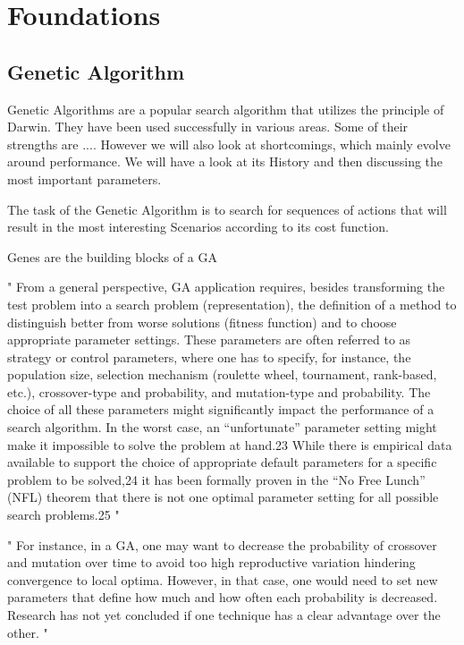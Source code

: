 \chapter{Foundations}
\label{chap:foundation}

\section{Genetic Algorithm}
\label{chap:foundation:genetic_algorithm}
Genetic Algorithms are a popular search algorithm that utilizes the principle of Darwin. They have been used successfully in various areas.
Some of their strengths are ....
However we will also look at shortcomings, which mainly evolve around performance.
We will have a look at its History and then discussing the most important parameters.

The task of the Genetic Algorithm is to search for sequences of actions that will result in the most interesting Scenarios according to its cost function.

Genes are the building blocks of a GA


"
From a general perspective, GA application requires, besides transforming the test problem into a search problem (representation), the definition of a method to distinguish better from worse solutions (fitness function) and to choose appropriate parameter settings. These parameters are often referred to as strategy or control parameters, where one has to specify, for instance, the population size, selection mechanism (roulette wheel, tournament, rank-based, etc.), crossover-type and probability, and mutation-type and probability. The choice of all these parameters might significantly impact the performance of a search algorithm. In the worst case, an “unfortunate” parameter setting might make it impossible to solve the problem at hand.23 While there is empirical data available to support the choice of appropriate default parameters for a specific problem to be solved,24 it has been formally proven in the “No Free Lunch” (NFL) theorem that there is not one optimal parameter setting for all possible search problems.25
"\cite{klampfl_using_nodate}

"
For instance, in a GA, one may want to decrease the probability of crossover and mutation over time to avoid too high reproductive variation hindering convergence to local optima. However, in that case, one would need to set new parameters that define how much and how often each probability is decreased. Research has not yet concluded if one technique has a clear advantage over the other.
"\cite{klampfl_using_nodate}



